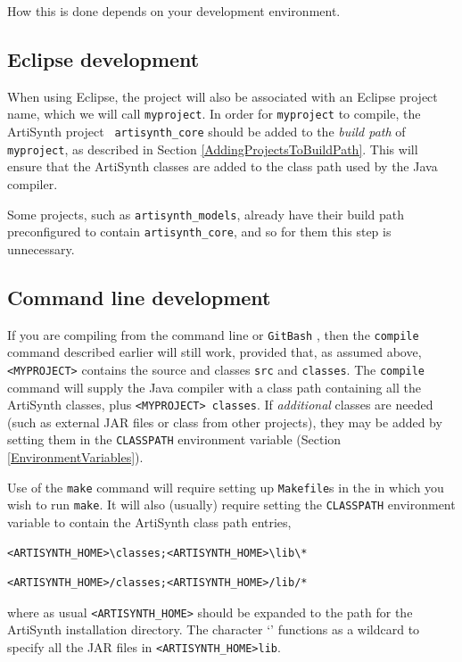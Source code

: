 How this is done depends on your development environment.

\subsection{Eclipse development}

When using Eclipse, the project will also be associated with an
Eclipse project name, which we will call {\tt myproject}.  In order
for {\tt myproject} to compile, the ArtiSynth project {\tt
artisynth\_core} should be added to the {\it build path} of {\tt
myproject}, as described in
Section \ref{AddingProjectsToBuildPath}. This will ensure that the
ArtiSynth classes are added to the class path used by the Java
compiler.

\begin{sideblock}
Some projects, such as {\tt artisynth\_models}, already have their
build path preconfigured to contain {\tt artisynth\_core}, and so for
them this step is unnecessary.
\end{sideblock}

\subsection{Command line development}
\label{CommandLineDevel}

If you are compiling from the command line 
\ifWindows
or {\tt GitBash}%
\fi
, then the {\tt compile} command described earlier will still work,
provided that, as assumed above, {\tt <MYPROJECT>} contains the source
and classes \directories{} {\tt src\SEP} and {\tt classes\SEP}. The
{\tt compile} command will supply the Java compiler with a class path
containing all the ArtiSynth classes, plus {\tt <MYPROJECT>\SEP
classes}. If {\it additional} classes are needed (such as external
JAR files or class \directories{} from other projects), they
may be added by setting them in the {\tt CLASSPATH} environment
variable (Section \ref{EnvironmentVariables}).

Use of the {\tt make} command will require setting up {\tt Makefile}s
in the \directories{} in which you wish to run {\tt make}. It will
also (usually) require setting the {\tt CLASSPATH} environment
variable to contain the ArtiSynth
class path entries,
\ifWindows
\begin{verbatim}
<ARTISYNTH_HOME>\classes;<ARTISYNTH_HOME>\lib\*
\end{verbatim}
\else
\begin{verbatim}
<ARTISYNTH_HOME>/classes;<ARTISYNTH_HOME>/lib/*
\end{verbatim}
\fi
where as usual {\tt <ARTISYNTH\_HOME>} should be expanded to the path
for the ArtiSynth installation directory.  The character `{\tt *}'
functions as a wildcard to specify all the JAR files in
{\tt <ARTISYNTH\_HOME>\SEP lib}.

